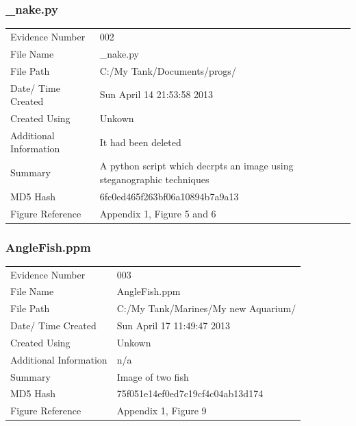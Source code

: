 \documentclass[12pt]{article}
\begin{document}
				\subsubsection{\_nake.py}
					\begin{tabular}{l | p{8cm}}
						Evidence Number & 002  \\
			    			File Name & \_nake.py  \\
			      			File Path & C:/My Tank/Documents/progs/  \\
						Date/ Time Created & Sun April 14 21:53:58 2013\\
						Created Using & Unkown\\
						Additional Information & It had been deleted\\
						Summary & A python script which decrpts an image using steganographic techniques\\
						MD5 Hash & 6fc0ed465f263bf06a10894b7a9a13\\
						Figure Reference &  Appendix 1, Figure 5 and 6\\
					\end{tabular}

				\subsubsection{AngleFish.ppm}
					\begin{tabular}{l | p{8cm}}
						Evidence Number & 003  \\
			    			File Name & AngleFish.ppm \\
			      			File Path & C:/My Tank/Marines/My new Aquarium/  \\
						Date/ Time Created & Sun April 17 11:49:47 2013 \\
						Created Using & Unkown \\
						Additional Information & n/a \\
						Summary & Image of two fish\\
						MD5 Hash & 75f051e14ef0ed7c19cf4c04ab13d174 \\
						Figure Reference &  Appendix 1, Figure 9\\
					\end{tabular}
\end{document}
